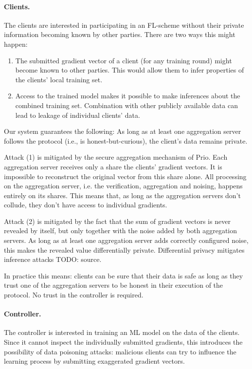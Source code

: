 \documentclass{article}
\begin{document}
\paragraph{Clients.} The clients are interested in participating in an FL-scheme
without their private information becoming known by other parties. There are two
ways this might happen:
\begin{enumerate}
\item The submitted gradient vector of a client (for any training round) might
  become known to other parties. This would allow them to infer properties of
  the clients' local training set.
\item Access to the trained model makes it possible to make inferences about the
  combined training set. Combination with other publicly available data can lead to
  leakage of individual clients' data.
\end{enumerate}
Our system guarantees the following: As long as at least one aggregation server
follows the protocol (i.e., is honest-but-curious), the client's data remains
private.

Attack (1) is mitigated by the secure aggregation mechanism of Prio.
Each aggregation server receives only a share
the clients' gradient vectors. It is impossible to reconstruct the original
vector from this share alone. All processing on the aggregation server, i.e.
the verification, aggregation and noising, happens entirely on its shares.
This means that, as long as the aggregation servers don't collude, they don't
have access to individual gradients.

Attack (2) is mitigated by the fact that the sum of
gradient vectors is never revealed by itself, but only together with the noise added by
both aggregation servers. As long as at least one aggregation server adds
correctly configured noise, this makes the revealed value differentially
private. Differential privacy mitigates inference attacks {\color{red}TODO: source}.

In practice this means: clients can be sure that their data is safe as long as
they trust one of the aggregation servers to be honest in their execution of the
protocol. No trust in the controller is required.

\paragraph{Controller.} The controller is interested in training an ML model on
the data of the clients. Since it cannot inspect the individually submitted
gradients, this introduces the possibility of data poisoning attacks: malicious
clients can try to influence the learning process by submitting exaggerated
gradient vectors.
\end{document}

